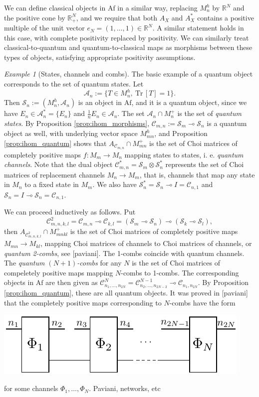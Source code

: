 \documentclass[12pt]{article}
\theoremstyle{definition}
\theoremstyle{remark}
\newtheorem{exm}{Example}
\def\Ce{\mathcal C}
\def \Tr{\mathrm{Tr}\,}
\def\Se {\mathcal S}
\def \Af{\mathrm{Af}}
\begin{document}
We can define classical objects in $\Af$ in a similar way, replacing $M_n^h$ by $\mathbb
R^N$ and the positive cone by $\mathbb R_+^N$, and we require that  both
$A_X$ and $A^*_X$ contains a positive multiple of the unit vector $e_N=(1,\dots,1)\in
\mathbb R^N$. A similar statement holds in this case,
with complete positivity replaced by positivity. We can similarly treat
classical-to-quantum and quantum-to-classical maps as morphisms between these types of
objects, satisfying appropriate positivity assumptions.

\begin{exm}[States, channels and combs] \label{exm:quantum_maps} The basic example of a quantum object
corresponds to the set of quantum states. Let  
\[
\mathcal A_n:=\{T\in M_n^h, \ \Tr[T]=1\}.
\]
Then $\Se_n:=(M_n^h,\mathcal A_n)$ is an object in $\Af$, and it is a quantum object, since we have 
 $E_n\in {\mathcal A}^*_n=\{E_n\}$ and $\frac 1n E_n\in
\mathcal A_n$. 
The set $\mathcal A_n\cap M_n^+$ is the set of {\em quantum states}. By Proposition
\ref{prop:ihom_morphisms}, $\Ce_{m,n}:=\Se_m\multimap \Se_n$ is a quantum object as well, with
underlying vector space $M_{mn}^h$, and
Proposition \ref{prop:ihom_quantum} shows that  $A_{\Ce_{m,n}}\cap M_{mn}^+$ is the set
of Choi matrices of completely positive maps $f:M_m\to M_n$ mapping states to states, 
i. e. {\em quantum channels}. Note that the dual object
$\Ce^*_{m,n}=\Se_m\otimes \Se_n^*$ represents the set of Choi matrices of replacement
channels $M_n\to M_m$, that is, channels that map any state in $M_n$ to a fixed state
in $M_m$. We also have $\Se^*_n=\Se_n\multimap I=\Ce_{n,1}$ and $\Se_n=I\multimap \Se_n=\Ce_{n,1}$. 

We can proceed inductively as follows. Put 
\[
\Ce^2_{m,n,k,l}=\Ce_{m,n}\multimap \Ce_{k,l}=(\Se_m\multimap \Se_n)\multimap (\Se_k\multimap
\Se_l),
\]
then
$A_{\Ce^2_{m,n,k,l}}\cap M_{mnkl}^+$
is the set of Choi matrices of completely positive maps $M_{mn}\to M_{kl}$, mapping Choi matrices of channels
to Choi matrices of channels, or {\em quantum 2-combs}, see [paviani]. The 1-combs
coincide with quantum channels. The {\em quantum
$(N+1)$-combs} for any $N$ is  the set of Choi matrices of
compeletely positive maps mapping $N$-combs to 1-combs. The corresponding objects in
$\Af$ are then given as
$\Ce^N_{n_1,\dots,n_{2N}}=\Ce^{N-1}_{n_2,\dots,n_{2N-2}}\multimap \Ce_{n_1,n_{2N}}$. By
Proposition 
\ref{prop:ihom_quantum}, these are all quantum objects. It was proved in [paviani] that
the completely positive maps corresponding to $N$-combs have the form 

\begin{center}
\includegraphics{general_comb.t1.pdf}
\end{center}


for some channels $\Phi_1,\dots, \Phi_N$.
{\color{red} Paviani, networks, etc}


\end{exm}
\end{document}
